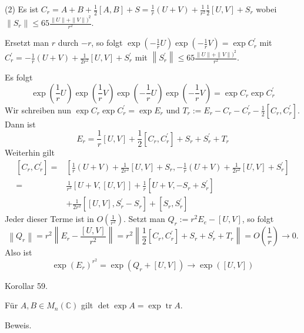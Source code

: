 \documentclass[10pt, letterpaper]{article}
\begin{document}
(2) Es ist $C_{r}=A+B+\frac{1}{2}[A, B]+S=\frac{1}{r}(U+V)+\frac{1}{r^{2}} \frac{1}{2}[U, V]+S_{r}$ wobei $\left\|S_{r}\right\| \leq 65 \frac{\|U\|+\|V\|)^{2}}{r^{2}}$.

Ersetzt man $r$ durch $-r$, so folgt $\exp \left(-\frac{1}{r} U\right) \exp \left(-\frac{1}{r} V\right)=\exp C_{r}^{\prime}$ mit $C_{r}^{\prime}=-\frac{1}{r}(U+V)+\frac{1}{2 r^{2}}[U, V]+S_{r}^{\prime}$ mit $\left\|S_{r}^{\prime}\right\| \leq 65 \frac{\|U\|+\|V\|)^{2}}{r^{2}}$.

Es folgt
$$
\exp \left(\frac{1}{r} U\right) \exp \left(\frac{1}{r} V\right) \exp \left(-\frac{1}{r} U\right) \exp \left(-\frac{1}{r} V\right)=\exp C_{r} \exp C_{r}^{\prime}
$$
Wir schreiben nun $\exp C_{r} \exp C_{r}^{\prime}=\exp E_{r}$ und $T_{r}:=E_{r}-C_{r}- C_{r}^{\prime}-\frac{1}{2}\left[C_{r}, C_{r}^{\prime}\right]$. Dann ist
$$
E_{r}=\frac{1}{r}[U, V]+\frac{1}{2}\left[C_{r}, C_{r}^{\prime}\right]+S_{r}+S_{r}^{\prime}+T_{r}
$$
Weiterhin gilt
$$
\begin{aligned}
{\left[C_{r}, C_{r}^{\prime}\right]=} & {\left[\frac{1}{r}(U+V)+\frac{1}{2 r^{2}}[U, V]+S_{r},-\frac{1}{r}(U+V)+\frac{1}{2 r^{2}}[U, V]+S_{r}^{\prime}\right] } \\
= & \frac{1}{r^{3}}[U+V,[U, V]]+\frac{1}{r}\left[U+V,-S_{r}+S_{r}^{\prime}\right] \\
& +\frac{1}{2 r^{2}}\left[[U, V], S_{r}^{\prime}-S_{r}\right]+\left[S_{r}, S_{r}^{\prime}\right]
\end{aligned}
$$
Jeder dieser Terme ist in $O\left(\frac{1}{r^{2}}\right)$. Setzt man $Q_{r}:=r^{2} E_{e}-[U, V]$, so folgt
$$
\left\|Q_{r}\right\|=r^{2}\left\|E_{r}-\frac{[U, V]}{r^{2}}\right\|=r^{2}\left\|\frac{1}{2}\left[C_{r}, C_{r}^{\prime}\right]+S_{r}+S_{r}^{\prime}+T_{r}\right\|=O\left(\frac{1}{r}\right) \rightarrow 0 .
$$
Also ist
$$
\exp \left(E_{r}\right)^{r^{2}}=\exp \left(Q_{r}+[U, V]\right) \rightarrow \exp ([U, V])
$$



Korollar 59. 

Für $A, B \in M_{n}(\mathbb{C})$ gilt $\operatorname{det} \exp A=\exp \operatorname{tr} A$.


Beweis. 
\end{document}
